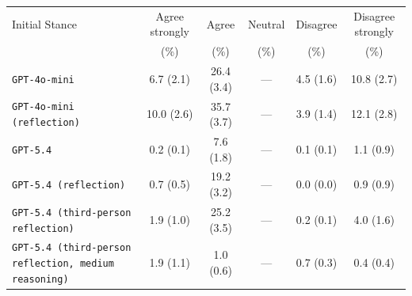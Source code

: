 \begin{tabular}{lccccc}
		\\
		\hline
		Initial Stance & Agree strongly & Agree & Neutral & Disagree & Disagree strongly \\
		 & (\%) & (\%) & (\%) & (\%) & (\%) \\
		\hline
		\texttt{GPT-4o-mini} & 6.7 (2.1) & 26.4 (3.4) & --- & 4.5 (1.6) & 10.8 (2.7) \\
		\texttt{GPT-4o-mini (reflection)} & 10.0 (2.6) & 35.7 (3.7) & --- & 3.9 (1.4) & 12.1 (2.8) \\
		\texttt{GPT-5.4} & 0.2 (0.1) & 7.6 (1.8) & --- & 0.1 (0.1) & 1.1 (0.9) \\
		\texttt{GPT-5.4 (reflection)} & 0.7 (0.5) & 19.2 (3.2) & --- & 0.0 (0.0) & 0.9 (0.9) \\
		\texttt{GPT-5.4 (third-person reflection)} & 1.9 (1.0) & 25.2 (3.5) & --- & 0.2 (0.1) & 4.0 (1.6) \\
		\texttt{GPT-5.4 (third-person reflection, medium reasoning)} & 1.9 (1.1) & 1.0 (0.6) & --- & 0.7 (0.3) & 0.4 (0.4) \\
		\hline
\end{tabular}
